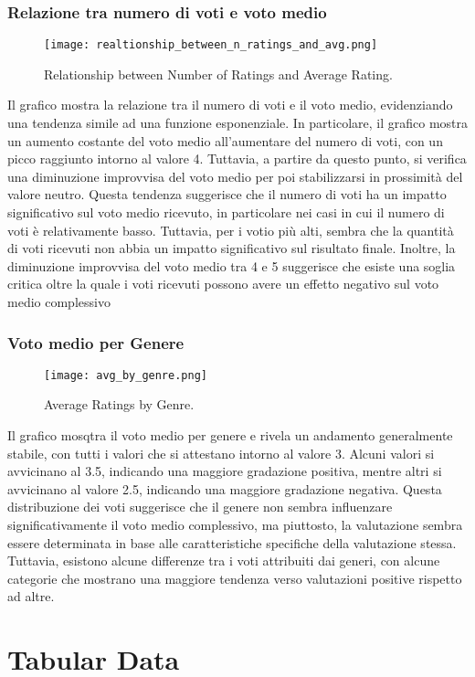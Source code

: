 \documentclass[../../Report.tex]{subfiles}
\begin{document}
\subsubsection{Relazione tra numero di voti e voto medio}
\begin{figure}[H]
    \centering
    \texttt{[image: realtionship\_between\_n\_ratings\_and\_avg.png]}
    \caption{Relationship between Number of Ratings and Average Rating.}
    \label{fig:realtionship_between_n_ratings_and_avg}
\end{figure}
Il grafico mostra la relazione tra il numero di voti e il voto medio, evidenziando una tendenza simile ad una funzione esponenziale.
In particolare, il grafico mostra un aumento costante del voto medio all'aumentare del numero di voti, con un picco raggiunto intorno al valore 4.
Tuttavia, a partire da questo punto, si verifica una diminuzione improvvisa del voto medio per poi stabilizzarsi in prossimità del valore neutro.
Questa tendenza suggerisce che il numero di voti ha un impatto significativo sul voto medio ricevuto, in particolare nei casi in cui il numero di voti è relativamente basso.
Tuttavia, per i votio più alti, sembra che la quantità di voti ricevuti non abbia un impatto significativo sul risultato finale. Inoltre, la diminuzione improvvisa del voto medio tra 4 e 5 suggerisce che esiste una soglia critica oltre la quale i voti ricevuti possono avere un effetto negativo sul voto medio complessivo


\subsubsection{Voto medio per Genere}
\begin{figure}[H]
    \centering
    \texttt{[image: avg\_by\_genre.png]}
    \caption{Average Ratings by Genre.}
    \label{fig:avg_by_genre}
\end{figure}
Il grafico mosqtra il voto medio per genere e rivela un andamento generalmente stabile, con tutti i valori che si attestano intorno al valore 3.
Alcuni valori si avvicinano al 3.5, indicando una maggiore gradazione positiva, mentre altri si avvicinano al valore 2.5, indicando una maggiore gradazione negativa.
Questa distribuzione dei voti suggerisce che il genere non sembra influenzare significativamente il voto medio complessivo, ma piuttosto, la valutazione sembra essere determinata in base alle caratteristiche specifiche della valutazione stessa.
Tuttavia, esistono alcune differenze tra i voti attribuiti dai generi, con alcune categorie che mostrano una maggiore tendenza verso valutazioni positive rispetto ad altre.



\section{Tabular Data}
\end{document}
